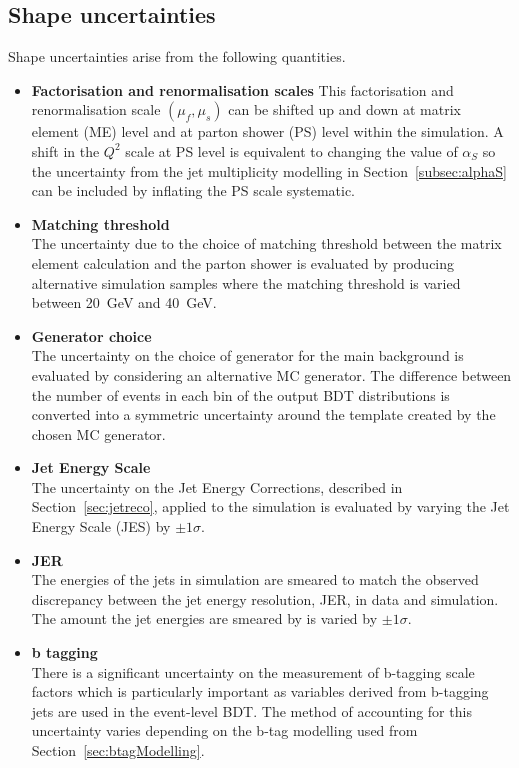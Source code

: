 \subsection{Shape uncertainties}
 Shape uncertainties arise from the following quantities.
\begin{itemize}
\item \textbf{Factorisation and renormalisation scales}
This factorisation and renormalisation scale $\left(\mu_{f},\mu_{s}\right)$ can be shifted up and down at matrix element (ME) level and at parton shower (PS) level within the simulation. A shift in the $Q^{2}$ scale at PS level is equivalent to changing the value of $\alpha_{S}$ so the uncertainty from the jet multiplicity modelling in Section~\ref{subsec:alphaS} can be included by inflating the PS scale systematic.

\item \textbf{Matching threshold}\\
The uncertainty due to the choice of matching threshold between the matrix element calculation and the parton shower is evaluated by producing alternative simulation samples where the matching threshold is varied between 20~GeV and 40~GeV.

\item \textbf{Generator choice}\\
The uncertainty on the choice of generator for the main \ttbar background is evaluated by considering an alternative \ttbar MC generator. The difference between the number of events in each bin of the output BDT distributions is converted into a symmetric uncertainty around the template created by the chosen MC generator.

\item \textbf{Jet Energy Scale}\\
The uncertainty on the Jet Energy Corrections, described in Section~\ref{sec:jetreco}, applied to the simulation is evaluated by varying the Jet Energy Scale (JES) by $\pm 1\sigma$.

\item \textbf{JER}\\
The energies of the jets in simulation are smeared to match the observed discrepancy between the jet energy resolution, JER, in data and simulation. The amount the jet energies are smeared by is varied by $\pm 1\sigma$.

\item \textbf{b tagging}\\
There is a significant uncertainty on the measurement of b-tagging scale factors which is particularly important as variables derived from b-tagging jets are used in the event-level BDT. The method of accounting for this uncertainty varies depending on the b-tag modelling used from Section~\ref{sec:btagModelling}.


\end{itemize}
